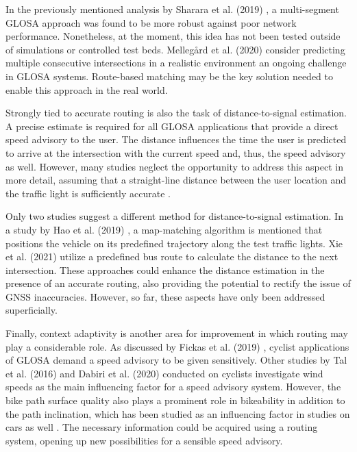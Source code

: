 In the previously mentioned analysis by Sharara et al. (2019) \cite{sharara_impact_2019}, a multi-segment GLOSA approach was found to be more robust against poor network performance. Nonetheless, at the moment, this idea has not been tested outside of simulations or controlled test beds. Mellegård et al. (2020) \cite{mellegard_day_2020} consider predicting multiple consecutive intersections in a realistic environment an ongoing challenge in GLOSA systems. Route-based matching may be the key solution needed to enable this approach in the real world.

Strongly tied to accurate routing is also the task of distance-to-signal estimation. A precise estimate is required for all GLOSA applications that provide a direct speed advisory to the user. The distance influences the time the user is predicted to arrive at the intersection with the current speed and, thus, the speed advisory as well. However, many studies neglect the opportunity to address this aspect in more detail, assuming that a straight-line distance between the user location and the traffic light is sufficiently accurate \cite{iglesias_i2v_2008, katsaros_performance_2011, koukoumidis_signalguru_2011, koukoumidis_leveraging_2012, krause_traffic_2012, li_open_2012, stevanovic_green_2013, eckhoff_potentials_2013, tal_vehicular-communications-based_2016, bernais_design_2016, stebbins_characterising_2017, sharara_impact_2019}. 

Only two studies suggest a different method for distance-to-signal estimation. In a study by Hao et al. (2019) \cite{hao_eco-approach_2019}, a map-matching algorithm is mentioned that positions the vehicle on its predefined trajectory along the test traffic lights. Xie et al. (2021) \cite{xie_dynamic_2021} utilize a predefined bus route to calculate the distance to the next intersection. These approaches could enhance the distance estimation in the presence of an accurate routing, also providing the potential to rectify the issue of GNSS inaccuracies. However, so far, these aspects have only been addressed superficially.

Finally, context adaptivity is another area for improvement in which routing may play a considerable role. As discussed by Fickas et al. (2019) \cite{fickas_fast_2019}, cyclist applications of GLOSA demand a speed advisory to be given sensitively. Other studies by Tal et al. (2016) \cite{tal_vehicular-communications-based_2016} and Dabiri et al. (2020) \cite{dabiri_optimized_2020} conducted on cyclists investigate wind speeds as the main influencing factor for a speed advisory system. However, the bike path surface quality also plays a prominent role in bikeability \cite{wasserman_evaluating_2019} in addition to the path inclination, which has been studied as an influencing factor in studies on cars as well \cite{zhang_green_2020}. The necessary information could be acquired using a routing system, opening up new possibilities for a sensible speed advisory.

